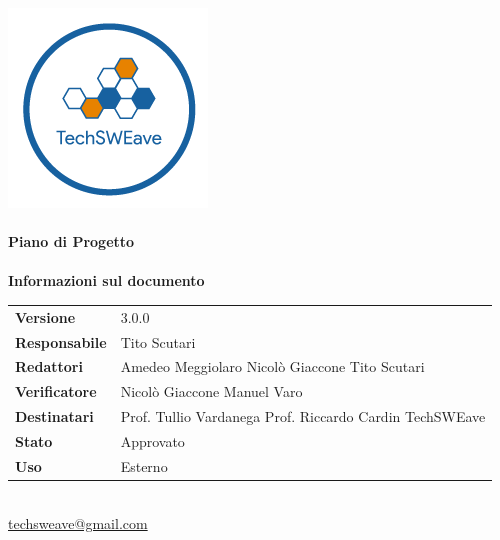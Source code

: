 \documentclass[a4paper]{article}
\begin{document}
\begin{titlepage}
    \begin{center}
        \includegraphics{../../../Images/logo}\\
        \vspace{20px}
        \textcolor{logo}{\hrulefill}\\
        \vspace{20px}
        \textbf{\huge\textcolor{logo}{Piano di Progetto}}\\
        \vspace{10px}
        \textcolor{logo}{\hrulefill}\\
        \vspace{40px}
        \textbf{\Large Informazioni sul documento}\\
        \vspace{20px}
        \begin{tabular}{p{100px} | p{100px}}
            \textbf{Versione}     & 3.0.0                                                                     \\
            \textbf{Responsabile} & Tito Scutari                                                              \\
            \textbf{Redattori}    & Amedeo Meggiolaro \newline Nicolò Giaccone \newline Tito Scutari          \\
            \textbf{Verificatore} & Nicolò Giaccone \newline Manuel Varo                                      \\
            \textbf{Destinatari}  & Prof. Tullio Vardanega \newline Prof. Riccardo Cardin \newline TechSWEave \\
            \textbf{Stato}        & Approvato                                                                 \\
            \textbf{Uso}          & Esterno                                                                   \\
        \end{tabular}\\
        \vspace{60px}
        \href{mailto:techsweave@gmail.com}{techsweave@gmail.com}\\

    \end{center}
\end{titlepage}
\end{document}
